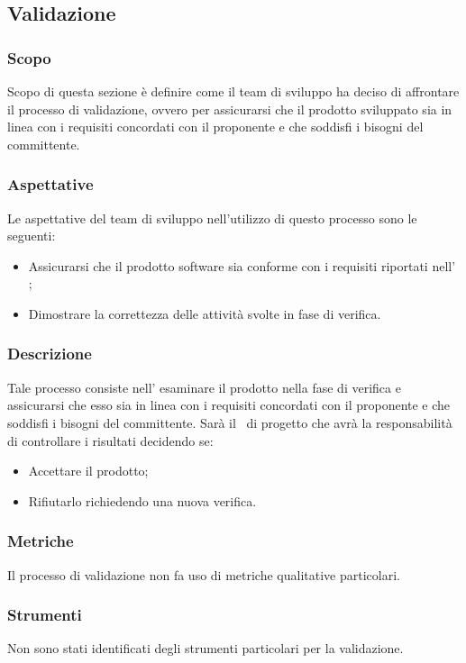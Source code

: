 \pagebreak

\subsection{Validazione}\label{subsection: validazione}
\subsubsection{Scopo}
Scopo di questa sezione è definire come il team di sviluppo ha deciso di affrontare il processo di validazione, ovvero per assicurarsi che il prodotto sviluppato sia in linea con i requisiti concordati con il proponente e che soddisfi i bisogni del committente.
\subsubsection{Aspettative}
Le aspettative del team di sviluppo nell'utilizzo di questo processo sono le seguenti: 
\begin{itemize}
    \item Assicurarsi che il prodotto software sia conforme con i requisiti riportati nell' \docNameAdRLow;
    \item  Dimostrare la correttezza delle attività svolte in fase di verifica.
\end{itemize}
\subsubsection{Descrizione}
Tale processo consiste nell' esaminare il prodotto nella fase di verifica e assicurarsi che esso sia in linea con i requisiti concordati con il proponente e che soddisfi i bisogni del committente.
Sarà il \roleProjectManagerLow\ di progetto che avrà la responsabilità di controllare i risultati decidendo se:
\begin{itemize}
    \item Accettare il prodotto;
    \item Rifiutarlo richiedendo una nuova verifica.
\end{itemize}    
\subsubsection{Metriche}
Il processo di validazione non fa uso di metriche qualitative particolari.

\subsubsection{Strumenti}
Non sono stati identificati degli strumenti particolari per la validazione.


